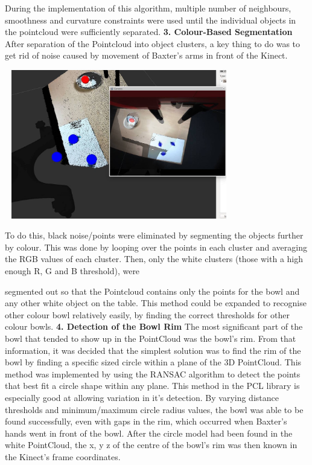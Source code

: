 During the implementation of this algorithm, multiple number of neighbours, smoothness and curvature constraints were used until the individual objects in the pointcloud were sufficiently separated.
\newline
\newline
\textbf{3. Colour-Based Segmentation}
\newline
After separation of the Pointcloud into object clusters, a key thing to do was to get rid of noise caused by movement of Baxter's arms in front of the Kinect. 
\begin{minipage}[t]{0.64\textwidth}
\smallskip
\centering
\includegraphics[width = 10cm, height = 6.5cm]{sweettransformation.jpg}
\centering
{}
\bigskip
\end{minipage}
\hspace{0.5cm}
\begin{minipage}[t]{0.29\textwidth}
\raggedright
To do this, black noise/points were eliminated by segmenting the objects further by colour. This was done by looping over the points in each cluster and averaging the RGB values of each cluster. Then, only the white clusters (those with a high enough R, G and B threshold), were
\end{minipage}	
segmented out so that the Pointcloud contains only the points for the bowl and any other white object on the table. This method could be expanded to recognise other colour bowl relatively easily, by finding the correct thresholds for other colour bowls.
\newline
\newline
\textbf{4. Detection of the Bowl Rim}
\newline
The most significant part of the bowl that tended to show up in the PointCloud was the bowl's rim. From that information, it was decided that the simplest solution was to find the rim of the bowl by finding a specific sized circle within a plane of the 3D PointCloud. This method was implemented by using the RANSAC algorithm to detect the points that best fit a circle shape within any plane. This method in the PCL library is especially good at allowing variation in it's detection. By varying distance thresholds and minimum/maximum circle radius values, the bowl was able to be found successfully, even with gaps in the rim, which occurred when Baxter's hands went in front of the bowl. After the circle model had been found in the white PointCloud, the x, y z of the centre of the bowl's rim was then known in the Kinect's frame coordinates.
